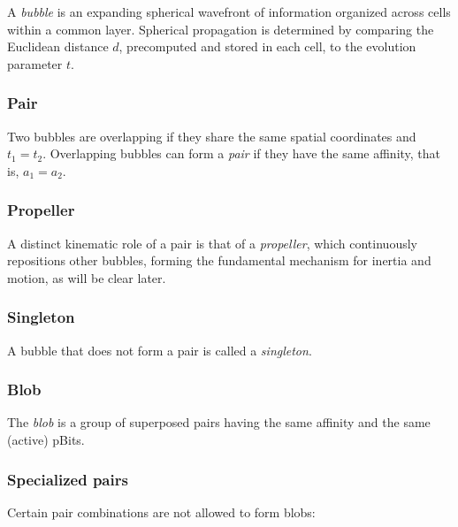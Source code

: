 \documentclass[12pt]{article}
\begin{document}
A \emph{bubble} is an expanding spherical wavefront of information organized across cells within a common layer. Spherical propagation is determined by comparing the Euclidean distance $d$, precomputed and stored in each cell, to the evolution parameter $t$. 

\subsubsection{Pair}
Two bubbles are overlapping if they share the same spatial coordinates and $t_1=t_2$. Overlapping bubbles can form a \emph{pair} if they have the same affinity, that is, $a_1=a_2$.

\subsubsection{Propeller} \label{subsubsec:propeller}
A distinct kinematic role of a pair is that of a \textit{propeller}, which continuously repositions other bubbles, forming the fundamental mechanism for inertia and motion, as will be clear later.

\subsubsection{Singleton}
A bubble that does not form a pair is called a \textit{singleton}.

\subsubsection{Blob}
The \textit{blob} is a group of superposed pairs having the same affinity and the same (active) pBits.

\subsubsection{Specialized pairs} \label{subsec:specialized-pairs}
Certain pair combinations are not allowed to form blobs: 
\end{document}
